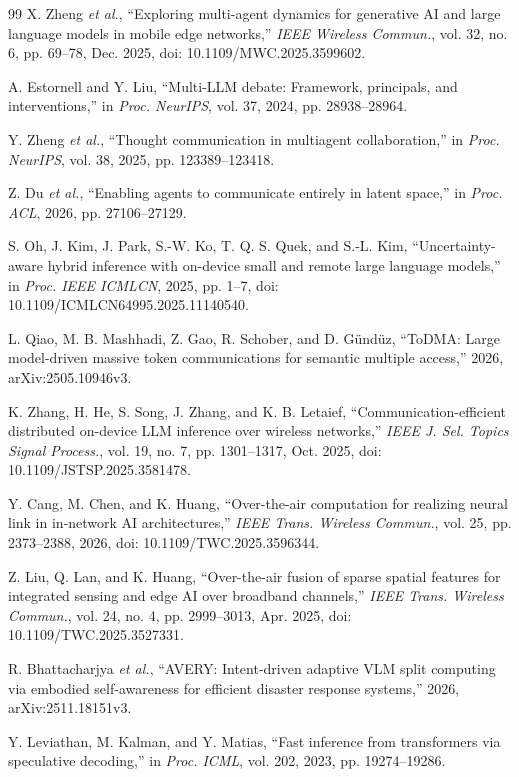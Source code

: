 \documentclass[letterpaper,journal]{IEEEtran}
\newcommand{\etal}{\emph{et al.}}
\begin{document}
\begin{thebibliography}{99}
X. Zheng \etal, ``Exploring multi-agent dynamics for generative AI and large
language models in mobile edge networks,'' \emph{IEEE Wireless Commun.},
vol. 32, no. 6, pp. 69--78, Dec. 2025,
doi: 10.1109/MWC.2025.3599602.

A. Estornell and Y. Liu, ``Multi-LLM debate: Framework, principals, and
interventions,'' in \emph{Proc. NeurIPS}, vol. 37, 2024, pp. 28938--28964.

Y. Zheng \etal, ``Thought communication in multiagent collaboration,'' in
\emph{Proc. NeurIPS}, vol. 38, 2025, pp. 123389--123418.

Z. Du \etal, ``Enabling agents to communicate entirely in latent space,'' in
\emph{Proc. ACL}, 2026, pp. 27106--27129.

S. Oh, J. Kim, J. Park, S.-W. Ko, T. Q. S. Quek, and S.-L. Kim,
``Uncertainty-aware hybrid inference with on-device small and remote large
language models,'' in \emph{Proc. IEEE ICMLCN}, 2025, pp. 1--7,
doi: 10.1109/ICMLCN64995.2025.11140540.

L. Qiao, M. B. Mashhadi, Z. Gao, R. Schober, and D. G\"und\"uz, ``ToDMA:
Large model-driven massive token communications for semantic multiple access,''
2026, arXiv:2505.10946v3.

K. Zhang, H. He, S. Song, J. Zhang, and K. B. Letaief,
``Communication-efficient distributed on-device LLM inference over wireless
networks,'' \emph{IEEE J. Sel. Topics Signal Process.}, vol. 19, no. 7,
pp. 1301--1317, Oct. 2025,
doi: 10.1109/JSTSP.2025.3581478.

Y. Cang, M. Chen, and K. Huang, ``Over-the-air computation for realizing
neural link in in-network AI architectures,'' \emph{IEEE Trans. Wireless
Commun.}, vol. 25, pp. 2373--2388, 2026,
doi: 10.1109/TWC.2025.3596344.

Z. Liu, Q. Lan, and K. Huang, ``Over-the-air fusion of sparse spatial
features for integrated sensing and edge AI over broadband channels,''
\emph{IEEE Trans. Wireless Commun.}, vol. 24, no. 4, pp. 2999--3013,
Apr. 2025,
doi: 10.1109/TWC.2025.3527331.

R. Bhattacharjya \etal, ``AVERY: Intent-driven adaptive VLM split computing
via embodied self-awareness for efficient disaster response systems,''
2026, arXiv:2511.18151v3.

Y. Leviathan, M. Kalman, and Y. Matias, ``Fast inference from transformers
via speculative decoding,'' in \emph{Proc. ICML}, vol. 202, 2023,
pp. 19274--19286.


\end{thebibliography}
\end{document}
